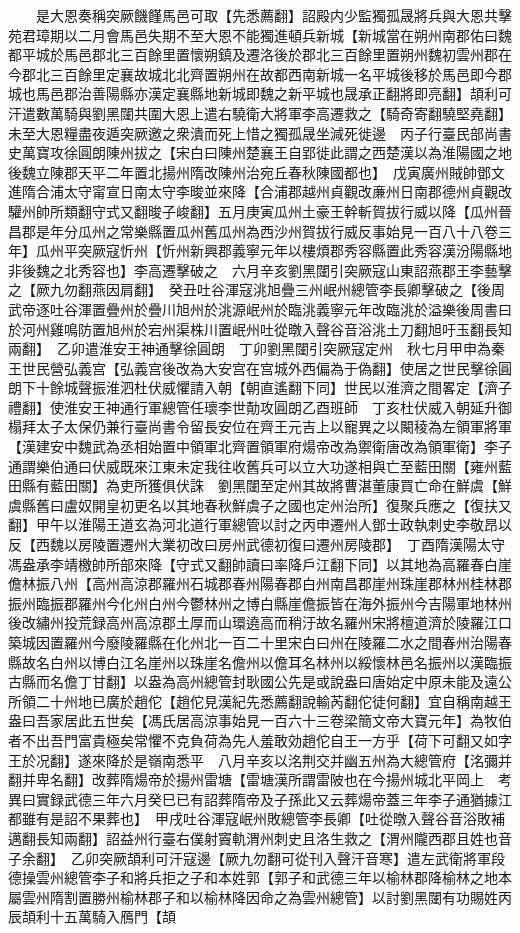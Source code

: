 　　是大恩奏稱突厥饑饉馬邑可取【先悉薦翻】詔殿内少監獨孤晟將兵與大恩共擊苑君璋期以二月會馬邑失期不至大恩不能獨進頓兵新城【新城當在朔州南郡佑曰魏都平城於馬邑郡北三百餘里置懷朔鎮及遷洛後於郡北三百餘里置朔州魏初雲州郡在今郡北三百餘里定襄故城北北齊置朔州在故都西南新城一名平城後移於馬邑即今郡城也馬邑郡治善陽縣亦漢定襄縣地新城即魏之新平城也晟承正翻將即亮翻】頡利可汗遣數萬騎與劉黑闥共圍大恩上遣右驍衛大將軍李高遷救之【騎奇寄翻驍堅堯翻】未至大恩糧盡夜遁突厥邀之衆潰而死上惜之獨孤晟坐減死徙邊　丙子行臺民部尚書史萬寶攻徐圓朗陳州拔之【宋白曰陳州楚襄王自郢徙此謂之西楚漢以為淮陽國之地後魏立陳郡天平二年置北揚州隋改陳州治宛丘春秋陳國都也】　戊寅廣州賊帥鄧文進隋合浦太守甯宣日南太守李晙並來降【合浦郡越州貞觀改亷州日南郡德州貞觀改驩州帥所類翻守式又翻晙子峻翻】五月庚寅瓜州土豪王幹斬賀拔行威以降【瓜州晉昌郡是年分瓜州之常樂縣置瓜州舊瓜州為西沙州賀拔行威反事始見一百八十八卷三年】瓜州平突厥寇忻州【忻州新興郡義寧元年以樓煩郡秀容縣置此秀容漢汾陽縣地非後魏之北秀容也】李高遷擊破之　六月辛亥劉黑闥引突厥寇山東詔燕郡王李藝擊之【厥九勿翻燕因肩翻】　癸丑吐谷渾寇洮旭疊三州岷州總管李長卿擊破之【後周武帝逐吐谷渾置疊州於疊川旭州於洮源岷州於臨洮義寧元年改臨洮於溢樂後周書曰於河州雞鳴防置旭州於宕州渠株川置岷州吐從暾入聲谷音浴洮土刀翻旭吁玉翻長知兩翻】　乙卯遣淮安王神通擊徐圓朗　丁卯劉黑闥引突厥寇定州　秋七月甲申為秦王世民營弘義宫【弘義宫後改為大安宫在宫城外西偏為于偽翻】使居之世民擊徐圓朗下十餘城聲振淮泗杜伏威懼請入朝【朝直遙翻下同】世民以淮濟之間畧定【濟子禮翻】使淮安王神通行軍總管任瓌李世勣攻圓朗乙酉班師　丁亥杜伏威入朝延升御榻拜太子太保仍兼行臺尚書令留長安位在齊王元吉上以寵異之以闞稜為左領軍將軍【漢建安中魏武為丞相始置中領軍北齊置領軍府煬帝改為禦衛唐改為領軍衛】李子通謂樂伯通曰伏威既來江東未定我往收舊兵可以立大功遂相與亡至藍田關【雍州藍田縣有藍田關】為吏所獲俱伏誅　劉黑闥至定州其故將曹湛董康買亡命在鮮虞【鮮虞縣舊曰盧奴開皇初更名以其地春秋鮮虞子之國也定州治所】復聚兵應之【復扶又翻】甲午以淮陽王道玄為河北道行軍總管以討之丙申遷州人鄧士政執刺史李敬昂以反【西魏以房陵置遷州大業初改曰房州武德初復曰遷州房陵郡】　丁酉隋漢陽太守馮盎承李靖檄帥所部來降【守式又翻帥讀曰率降戶江翻下同】以其地為高羅春白崖儋林振八州【高州高涼郡羅州石城郡春州陽春郡白州南昌郡崖州珠崖郡林州桂林郡振州臨振郡羅州今化州白州今鬱林州之博白縣崖儋振皆在海外振州今吉陽軍地林州後改繡州投荒録高州高涼郡土厚而山環遶高而稍汙故名羅州宋將檀道濟於陵羅江口築城因置羅州今廢陵羅縣在化州北一百二十里宋白曰州在陵羅二水之間春州治陽春縣故名白州以博白江名崖州以珠崖名儋州以儋耳名林州以綏懷林邑名振州以漢臨振古縣而名儋丁甘翻】以盎為高州總管封耿國公先是或說盎曰唐始定中原未能及遠公所領二十州地已廣於趙佗【趙佗見漢紀先悉薦翻說輸芮翻佗徒何翻】宜自稱南越王盎曰吾家居此五世矣【馮氏居高涼事始見一百六十三卷梁簡文帝大寶元年】為牧伯者不出吾門富貴極矣常懼不克負荷為先人羞敢効趙佗自王一方乎【荷下可翻又如字王於况翻】遂來降於是嶺南悉平　八月辛亥以洺荆交并幽五州為大總管府【洺彌并翻并卑名翻】改葬隋煬帝於揚州雷塘【雷塘漢所謂雷陂也在今揚州城北平岡上　考異曰實録武德三年六月癸巳已有詔葬隋帝及子孫此又云葬煬帝蓋三年李子通猶據江都雖有是詔不果葬也】　甲戌吐谷渾寇岷州敗總管李長卿【吐從暾入聲谷音浴敗補邁翻長知兩翻】詔益州行臺右僕射竇軌渭州刺史且洛生救之【渭州隴西郡且姓也音子余翻】　乙卯突厥頡利可汗寇邊【厥九勿翻可從刊入聲汗音寒】遣左武衛將軍段德操雲州總管李子和將兵拒之子和本姓郭【郭子和武德三年以榆林郡降榆林之地本屬雲州隋割置勝州榆林郡子和以榆林降因命之為雲州總管】以討劉黑闥有功賜姓丙辰頡利十五萬騎入鴈門【頡